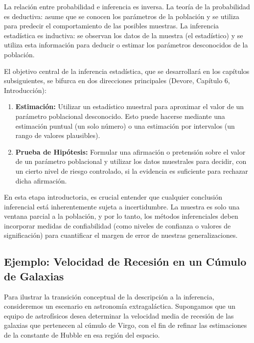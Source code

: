 La relación entre probabilidad e inferencia es inversa. La teoría de la probabilidad es deductiva: asume que se conocen los parámetros de la población y se utiliza para predecir el comportamiento de las posibles muestras. La inferencia estadística es inductiva: se observan los datos de la muestra (el estadístico) y se utiliza esta información para deducir o estimar los parámetros desconocidos de la población.

El objetivo central de la inferencia estadística, que se desarrollará en los capítulos subsiguientes, se bifurca en dos direcciones principales (Devore, Capítulo 6, Introducción):
\begin{enumerate}
    \item \textbf{Estimación:} Utilizar un estadístico muestral para aproximar el valor de un parámetro poblacional desconocido. Esto puede hacerse mediante una estimación puntual (un solo número) o una estimación por intervalos (un rango de valores plausibles).
    \item \textbf{Prueba de Hipótesis:} Formular una afirmación o pretensión sobre el valor de un parámetro poblacional y utilizar los datos muestrales para decidir, con un cierto nivel de riesgo controlado, si la evidencia es suficiente para rechazar dicha afirmación.
\end{enumerate}

En esta etapa introductoria, es crucial entender que cualquier conclusión inferencial está inherentemente sujeta a incertidumbre. La muestra es solo una ventana parcial a la población, y por lo tanto, los métodos inferenciales deben incorporar medidas de confiabilidad (como niveles de confianza o valores de significación) para cuantificar el margen de error de nuestras generalizaciones.

\subsection{Ejemplo: Velocidad de Recesión en un Cúmulo de Galaxias}

Para ilustrar la transición conceptual de la descripción a la inferencia, consideremos un escenario en astronomía extragaláctica. Supongamos que un equipo de astrofísicos desea determinar la velocidad media de recesión de las galaxias que pertenecen al cúmulo de Virgo, con el fin de refinar las estimaciones de la constante de Hubble en esa región del espacio.

